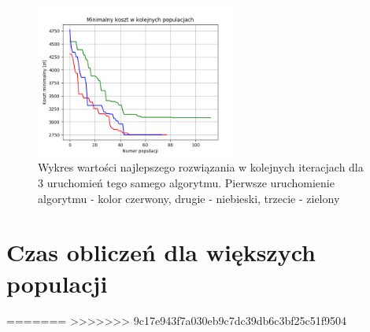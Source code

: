 \documentclass[12pt, oneside, final]{report}
\begin{document}
\begin{figure}[ht!]
\centering
\includegraphics[width=0.6\textwidth]{graphics/disconnect}
\caption{Wykres wartości najlepszego rozwiązania w kolejnych iteracjach dla 3 uruchomień tego samego algorytmu. Pierwsze uruchomienie algorytmu - kolor czerwony, drugie - niebieski, trzecie - zielony}
\label{fig:disconnect}
\end{figure}

\section{Czas obliczeń dla większych populacji}
=======
>>>>>>> 9c17e943f7a030eb9c7dc39db6c3bf25c51f9504
 
\end{document}
